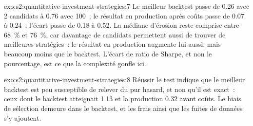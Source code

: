 \begin{solution}{exo:s2:quantitative-investment-strategies:7}
Le meilleur backtest passe de 0.26 avec 2 candidats à 0.76 avec 100~; le résultat en production après coûts passe de 0.07 à 0.24~; l'écart passe de 0.18 à 0.52. La
médiane d'érosion reste comprise entre 68~\% et 76~\%, car davantage de candidats permettent aussi de trouver de meilleures stratégies~: le résultat en production augmente lui aussi, mais beaucoup moins que le
backtest. L'écart de ratio de Sharpe, et non le pourcentage, est ce que la complexité gonfle ici.
\end{solution}

\begin{solution}{exo:s2:quantitative-investment-strategies:8}
Réussir le test indique que le meilleur backtest est peu susceptible de relever du pur hasard, et non qu'il est exact~: ceux dont le backtest atteignait 1.13 et la production 0.32 avant
coûts. Le biais de sélection demeure dans le backtest, et les frais ainsi que les fuites de données s'y ajoutent.
\end{solution}

